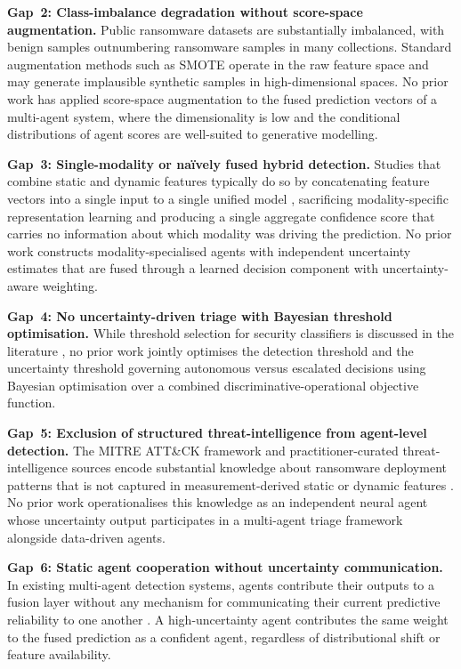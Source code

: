 \textbf{Gap~2: Class-imbalance degradation without score-space augmentation.}
Public ransomware datasets are substantially imbalanced, with benign samples outnumbering
ransomware samples in many collections.
Standard augmentation methods such as SMOTE \cite{chawla2002smote} operate in the raw feature
space and may generate implausible synthetic samples in high-dimensional spaces.
No prior work has applied score-space augmentation to the fused prediction vectors of a
multi-agent system, where the dimensionality is low and the conditional distributions of
agent scores are well-suited to generative modelling.

\textbf{Gap~3: Single-modality or na\"{i}vely fused hybrid detection.}
Studies that combine static and dynamic features typically do so by concatenating feature
vectors into a single input to a single unified model \cite{Ferdous2024Comp}, sacrificing
modality-specific representation learning and producing a single aggregate confidence score
that carries no information about which modality was driving the prediction.
No prior work constructs modality-specialised agents with independent uncertainty estimates
that are fused through a learned decision component with uncertainty-aware weighting.

\textbf{Gap~4: No uncertainty-driven triage with Bayesian threshold optimisation.}
While threshold selection for security classifiers is discussed in the
literature \cite{Farzadpour2024Thresholding}, no prior work jointly optimises the
detection threshold and the uncertainty threshold governing autonomous versus escalated
decisions using Bayesian optimisation over a combined discriminative-operational objective
function.

\textbf{Gap~5: Exclusion of structured threat-intelligence from agent-level detection.}
The MITRE ATT\&CK framework and practitioner-curated threat-intelligence sources encode
substantial knowledge about ransomware deployment patterns that is not captured in
measurement-derived static or dynamic features \cite{razaulla2023age, Alraizza2025StorageAP}.
No prior work operationalises this knowledge as an independent neural agent whose uncertainty
output participates in a multi-agent triage framework alongside data-driven agents.

\textbf{Gap~6: Static agent cooperation without uncertainty communication.}
In existing multi-agent detection systems, agents contribute their outputs to a fusion layer
without any mechanism for communicating their current predictive reliability to one
another \cite{MultiAgentAdaptiveDetection2023}.
A high-uncertainty agent contributes the same weight to the fused prediction as a confident
agent, regardless of distributional shift or feature availability.

